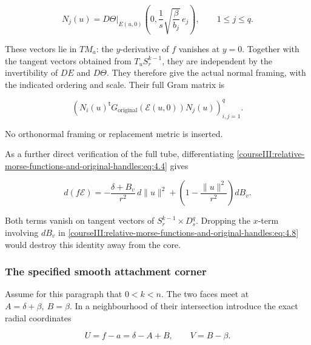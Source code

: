\begin{equation}
N_j(u)=D\Theta|_{E(u,0)}
       \left(0,\frac1s\sqrt{\frac{\beta}{b_j}}\,e_j\right),
\qquad 1\leq j\leq q.
\label{courseIII:relative-morse-functions-and-original-handles:eq:4.9}
\end{equation}

These vectors lie in \(TM_a\): the \(y\)-derivative of \(f\) vanishes at \(y=0\). Together with the tangent vectors obtained from \(T_uS_r^{k-1}\), they are independent by the invertibility of \(DE\) and \(D\Theta\). They therefore give the actual normal framing, with the indicated ordering and scale. Their full Gram matrix is

\begin{equation}
\left(N_i(u)^{\mathsf t}G_{\mathrm{original}}(\mathcal E(u,0))
                     N_j(u)\right)_{i,j=1}^q.
\label{courseIII:relative-morse-functions-and-original-handles:eq:4.10}
\end{equation}

No orthonormal framing or replacement metric is inserted.

As a further direct verification of the full tube, differentiating \eqref{courseIII:relative-morse-functions-and-original-handles:eq:4.4} gives

\begin{equation}
d(f\mathcal E)=
-\frac{\delta+B_v}{r^2}\,d\|u\|^2
+\left(1-\frac{\|u\|^2}{r^2}\right)dB_v.
\label{courseIII:relative-morse-functions-and-original-handles:eq:4.11}
\end{equation}

Both terms vanish on tangent vectors of \(S_r^{k-1}\times D_s^q\). Dropping the \(x\)-term involving \(dB_v\) in \eqref{courseIII:relative-morse-functions-and-original-handles:eq:4.8} would destroy this identity away from the core.

\subsubsection{The specified smooth attachment corner}
\label{courseIII:relative-morse-functions-and-original-handles:section-4.2}

Assume for this paragraph that \(0<k<n\). The two faces meet at \(A=\delta+\beta,\ B=\beta\). In a neighbourhood of their intersection introduce the exact radial coordinates

\begin{equation}
U=f-a=\delta-A+B,\qquad V=B-\beta.
\label{courseIII:relative-morse-functions-and-original-handles:eq:4.12}
\end{equation}

